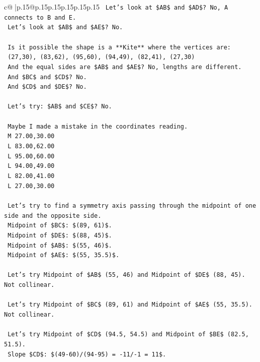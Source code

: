 \documentclass{article}
\begin{document}
{\begin{supertabular}{c@{$\;$}|p{.15\linewidth}@{}p{.15\linewidth}p{.15\linewidth}p{.15\linewidth}p{.15\linewidth}p{.15\linewidth}}
{{{\texttt{    Let's look at \$AB\$ and \$AD\$? No, A connects to B and E.} \\
\texttt{    Let's look at \$AB\$ and \$AE\$? No.} \\
\\ 
\texttt{    Is it possible the shape is a **Kite** where the vertices are:} \\
\texttt{    (27,30), (83,62), (95,60), (94,49), (82,41), (27,30)} \\
\texttt{    And the equal sides are \$AB\$ and \$AE\$? No, lengths are different.} \\
\texttt{    And \$BC\$ and \$CD\$? No.} \\
\texttt{    And \$CD\$ and \$DE\$? No.} \\
\\ 
\texttt{    Let's try: \$AB\$ and \$CE\$? No.} \\
\\ 
\texttt{    Maybe I made a mistake in the coordinates reading.} \\
\texttt{    M 27.00,30.00} \\
\texttt{    L 83.00,62.00} \\
\texttt{    L 95.00,60.00} \\
\texttt{    L 94.00,49.00} \\
\texttt{    L 82.00,41.00} \\
\texttt{    L 27.00,30.00} \\
\\ 
\texttt{    Let's try to find a symmetry axis passing through the midpoint of one side and the opposite side.} \\
\texttt{    Midpoint of \$BC\$: \$(89, 61)\$.} \\
\texttt{    Midpoint of \$DE\$: \$(88, 45)\$.} \\
\texttt{    Midpoint of \$AB\$: \$(55, 46)\$.} \\
\texttt{    Midpoint of \$AE\$: \$(55, 35.5)\$.} \\
\\ 
\texttt{    Let's try Midpoint of \$AB\$ (55, 46) and Midpoint of \$DE\$ (88, 45). Not collinear.} \\
\\ 
\texttt{    Let's try Midpoint of \$BC\$ (89, 61) and Midpoint of \$AE\$ (55, 35.5). Not collinear.} \\
\\ 
\texttt{    Let's try Midpoint of \$CD\$ (94.5, 54.5) and Midpoint of \$BE\$ (82.5, 51.5).} \\
\texttt{    Slope \$CD\$: \$(49{-}60)/(94{-}95) = {-}11/{-}1 = 11\$.} \\
}}}
\end{supertabular}}
\end{document}
